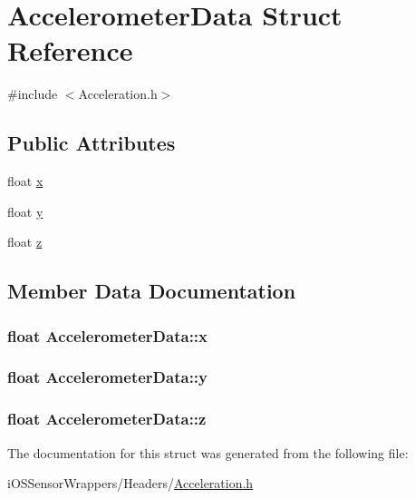 \hypertarget{struct_accelerometer_data}{\section{Accelerometer\+Data Struct Reference}
\label{struct_accelerometer_data}
}


{\ttfamily \#include $<$Acceleration.\+h$>$}

\subsection*{Public Attributes}
\begin{DoxyCompactItemize}
\item 
float \hyperlink{struct_accelerometer_data_a9ee0f133657eb28c8a408b7daa163cd6}{x}
\item 
float \hyperlink{struct_accelerometer_data_a1f18f5f9037a5090c736f4b2e7cb9a5c}{y}
\item 
float \hyperlink{struct_accelerometer_data_aaf1429b5828820046d8797908e804afc}{z}
\end{DoxyCompactItemize}


\subsection{Member Data Documentation}
\hypertarget{struct_accelerometer_data_a9ee0f133657eb28c8a408b7daa163cd6}{
\subsubsection[{x}]{\setlength{\rightskip}{0pt plus 5cm}float Accelerometer\+Data\+::x}}\label{struct_accelerometer_data_a9ee0f133657eb28c8a408b7daa163cd6}
\hypertarget{struct_accelerometer_data_a1f18f5f9037a5090c736f4b2e7cb9a5c}{
\subsubsection[{y}]{\setlength{\rightskip}{0pt plus 5cm}float Accelerometer\+Data\+::y}}\label{struct_accelerometer_data_a1f18f5f9037a5090c736f4b2e7cb9a5c}
\hypertarget{struct_accelerometer_data_aaf1429b5828820046d8797908e804afc}{
\subsubsection[{z}]{\setlength{\rightskip}{0pt plus 5cm}float Accelerometer\+Data\+::z}}\label{struct_accelerometer_data_aaf1429b5828820046d8797908e804afc}


The documentation for this struct was generated from the following file\+:\begin{DoxyCompactItemize}
\item 
i\+O\+S\+Sensor\+Wrappers/\+Headers/\hyperlink{_acceleration_8h}{Acceleration.\+h}\end{DoxyCompactItemize}
